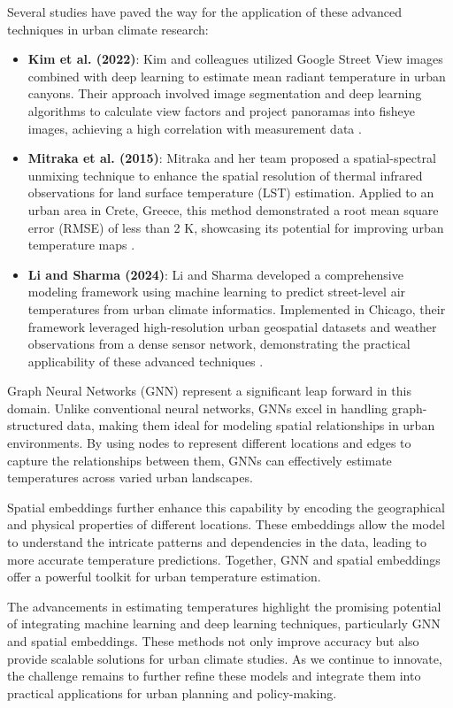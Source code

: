 \documentclass[runningheads,a4paper,11pt]{report}
\begin{document}
Several studies have paved the way for the application of these advanced techniques in urban climate research:

\begin{itemize}
    \item \textbf{Kim et al. (2022)}: Kim and colleagues utilized Google Street View images combined with deep learning to estimate mean radiant temperature in urban canyons. Their approach involved image segmentation and deep learning algorithms to calculate view factors and project panoramas into fisheye images, achieving a high correlation with measurement data \cite{Kim2022}.
    \item \textbf{Mitraka et al. (2015)}: Mitraka and her team proposed a spatial-spectral unmixing technique to enhance the spatial resolution of thermal infrared observations for land surface temperature (LST) estimation. Applied to an urban area in Crete, Greece, this method demonstrated a root mean square error (RMSE) of less than 2 K, showcasing its potential for improving urban temperature maps \cite{Mitraka2015}.
    \item \textbf{Li and Sharma (2024)}: Li and Sharma developed a comprehensive modeling framework using machine learning to predict street-level air temperatures from urban climate informatics. Implemented in Chicago, their framework leveraged high-resolution urban geospatial datasets and weather observations from a dense sensor network, demonstrating the practical applicability of these advanced techniques \cite{LiSharma2024}.
\end{itemize}



Graph Neural Networks (GNN) represent a significant leap forward in this domain. Unlike conventional neural networks, GNNs excel in handling graph-structured data, making them ideal for modeling spatial relationships in urban environments. By using nodes to represent different locations and edges to capture the relationships between them, GNNs can effectively estimate temperatures across varied urban landscapes.

Spatial embeddings further enhance this capability by encoding the geographical and physical properties of different locations. These embeddings allow the model to understand the intricate patterns and dependencies in the data, leading to more accurate temperature predictions. Together, GNN and spatial embeddings offer a powerful toolkit for urban temperature estimation.

The advancements in estimating temperatures highlight the promising potential of integrating machine learning and deep learning techniques, particularly GNN and spatial embeddings. These methods not only improve accuracy but also provide scalable solutions for urban climate studies. As we continue to innovate, the challenge remains to further refine these models and integrate them into practical applications for urban planning and policy-making.
\end{document}
